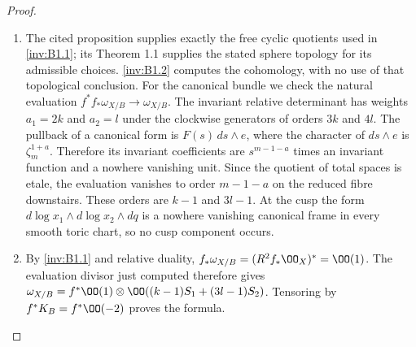 \begin{proof}
\begin{enumerate}[label=\arabic*.,leftmargin=*]
\item The cited proposition supplies exactly the free cyclic quotients used
in \ref{inv:B1.1}; its Theorem 1.1 supplies the stated sphere topology for its
admissible choices. \ref{inv:B1.2} computes the cohomology, with no use of that
topological conclusion.
For the canonical bundle we check the natural evaluation
$f^*f_*\omega_{X/B}\to\omega_{X/B}$.
The invariant relative determinant has weights $a_1=2k$ and $a_2=l$
under the clockwise generators of orders $3k$ and $4l$. The pullback
of a canonical form is $F(s)\,ds\wedge e$, where the character of
$ds\wedge e$ is $\zeta_m^{1+a}$. Therefore its invariant coefficients
are $s^{m-1-a}$ times an invariant function and a nowhere vanishing
unit. Since the quotient of total spaces is etale, the evaluation
vanishes to order $m-1-a$ on the reduced fibre downstairs. These orders
are $k-1$ and $3l-1$. At the cusp the form
$d\log x_1\wedge d\log x_2\wedge dq$ is a nowhere vanishing canonical
frame in every smooth toric chart, so no cusp component occurs.

\item By \ref{inv:B1.1} and relative duality,
$f_*\omega_{X/B}=(R^2f_*\OO_X)^*=\OO(1)$.
The evaluation divisor just computed therefore gives
$\omega_{X/B}=f^*\OO(1)\otimes
\OO((k-1)S_1+(3l-1)S_2)$. Tensoring by $f^*K_B=f^*\OO(-2)$
proves the formula.
\end{enumerate}
\end{proof}

